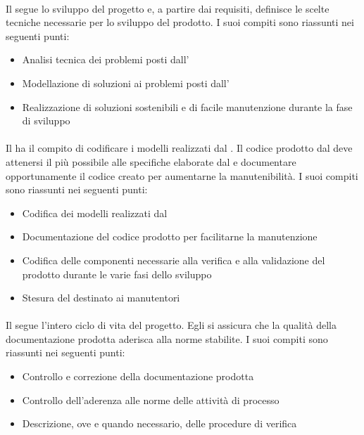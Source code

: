 \paragraph{\prog{}}
Il \prog{} segue lo sviluppo del progetto e, a partire dai requisiti, definisce le scelte tecniche necessarie per lo sviluppo del prodotto. 
I suoi compiti sono riassunti nei seguenti punti:
\begin{itemize}
\item Analisi tecnica dei problemi posti dall' \ana{}
\item Modellazione di soluzioni ai problemi posti dall' \ana{}
\item Realizzazione di soluzioni sostenibili e di facile manutenzione durante la fase di sviluppo
\end{itemize}

\paragraph{\progr{}}
Il \progr{} ha il compito di codificare i modelli realizzati dal \prog{}. Il codice prodotto dal \progr{} deve attenersi il più possibile alle specifiche elaborate dal \prog{} e documentare opportunamente il codice creato per aumentarne la manutenibilità.
I suoi compiti sono riassunti nei seguenti punti:
\begin{itemize}
\item Codifica dei modelli realizzati dal \prog{}
\item Documentazione del codice prodotto per facilitarne la manutenzione
\item Codifica delle componenti necessarie alla verifica e alla validazione del prodotto durante le varie fasi dello sviluppo
\item Stesura del \MU{} destinato ai manutentori
\end{itemize}

\paragraph{\ver{}}
Il \ver{} segue l'intero ciclo di vita del progetto. Egli si assicura che la qualità della documentazione prodotta aderisca alla norme stabilite.
I suoi compiti sono riassunti nei seguenti punti:
\begin{itemize}
\item Controllo e correzione della documentazione prodotta
\item Controllo dell'aderenza alle norme delle attività di processo
\item Descrizione, ove e quando necessario, delle procedure di verifica
\end{itemize}

